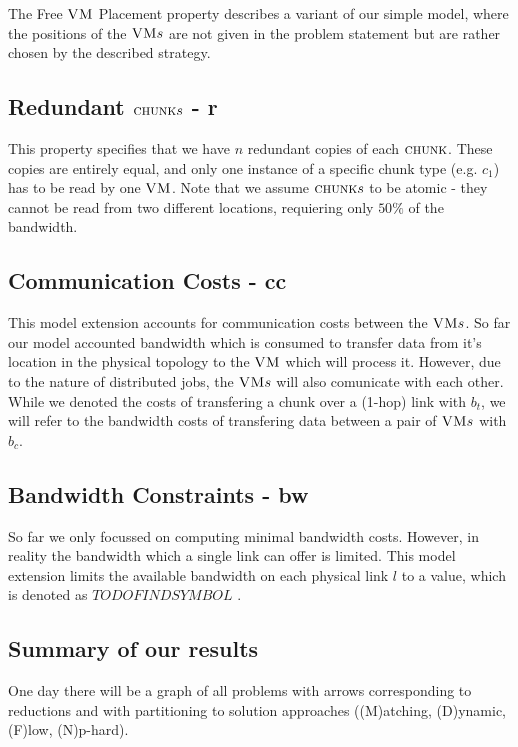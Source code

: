 The Free $\textsc{VM}$ Placement property describes a variant of our simple model, where the positions of the $\textsc{VM} s$ are not given in the problem statement but are rather chosen by the described strategy. 

\subsection{Redundant $\textsc{chunk} s$ - r}

This property specifies that we have $n$ redundant copies of each $\textsc{chunk}$. These copies are entirely equal, and only one instance of a specific chunk type (e.g. $c_1$) has to be read by one $\textsc{VM}$. Note that we assume $\textsc{chunk} s$ to be atomic - they cannot be read from two different locations, requiering only $50\%$ of the bandwidth.

\subsection{Communication Costs - cc}

This model extension accounts for communication costs between the $\textsc{VM} s$. So far our model accounted bandwidth which is consumed to transfer data from it's location in the physical topology to the $\textsc{VM}$ which will process it. However, due to the nature of distributed jobs, the $\textsc{VM} s$ will also comunicate with each other. While we denoted the costs of transfering a chunk over a (1-hop) link with $b_t$, we will refer to the bandwidth costs of transfering data between a pair of $\textsc{VM} s$ with $b_c$.

\subsection{Bandwidth Constraints - bw}

So far we only focussed on computing minimal bandwidth costs. However, in reality the bandwidth which a single link can offer is limited. This model extension limits the available bandwidth on each physical link $l$ to a value, which is denoted as $TODO FIND SYMBOL$ .

\subsection{Summary of our results}

One day there will be a graph of all problems with arrows
corresponding to reductions and with partitioning to solution
approaches ((M)atching, (D)ynamic, (F)low, (N)p-hard).

